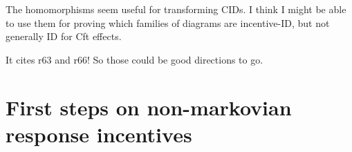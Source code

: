 \documentclass[letterpaper,10pt]{article}
\newtheorem{definition}{Definition}
\begin{document}
The homomorphisms seem useful for transforming CIDs.
I think I might be able to use them for proving which families of diagrams are incentive-ID, but not generally ID for Cft effects.

It cites r63 and r66! So those could be good directions to go.










\section{First steps on non-markovian response incentives}
\end{document}
